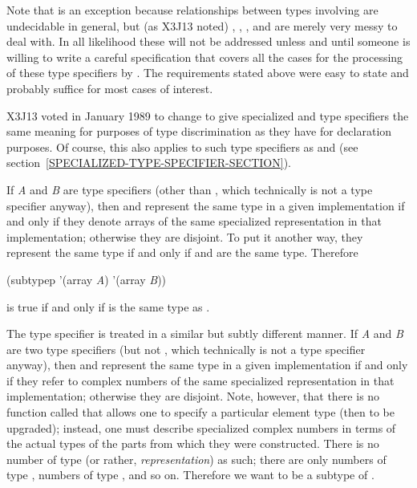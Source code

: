 \begin{defun}[Function]
\begin{new}
Note that  is an exception because relationships between
types involving  are undecidable in general, but (as X3J13 noted)
, , , and  are merely very messy to deal
with.  In all likelihood these will not be addressed unless and
until someone is willing to write a careful specification that covers
all the cases for the processing of these type
specifiers by .  The requirements stated above were easy
to state and probably suffice for most cases of interest.
\end{new}

\begin{new}
X3J13 voted in January 1989
to change  to give specialized
 and  type specifiers the same meaning for
purposes of type discrimination as they have for declaration purposes.
Of course, this also applies to such type specifiers as 
and 
(see section~\ref{SPECIALIZED-TYPE-SPECIFIER-SECTION}).

If \emph{A} and \emph{B} are type specifiers (other than \cdf{*}, which technically
is not a type specifier anyway), then 
and  represent the same type in a given implementation
if and only if they denote arrays
of the same specialized representation in that implementation;
otherwise they are disjoint.
To put it another way, they represent the same type
if and only if
 and
 are the same type.
Therefore
\begin{lisp}
(subtypep '(array \emph{A}) '(array \emph{B}))
\end{lisp}
is true if and only if
is the same type as
.

The  type specifier is treated in a similar but subtly different
manner.
If \emph{A} and \emph{B} are two type specifiers (but not \cdf{*}, which technically
is not a type specifier anyway), then 
and  represent the same type in a given implementation
if and only if they refer to complex numbers
of the same specialized representation in that implementation;
otherwise they are disjoint.
Note, however, that there is no function called  that
allows one to specify a particular element type (then to be upgraded);
instead, one must describe specialized complex numbers in terms of
the actual types of the parts from which they were constructed.
There is no number of type (or rather, \emph{representation\/})
 as such; there are only numbers of type ,
numbers of type ,
and so on.  Therefore we want  to
be a subtype of .


\end{new}
\end{defun}
